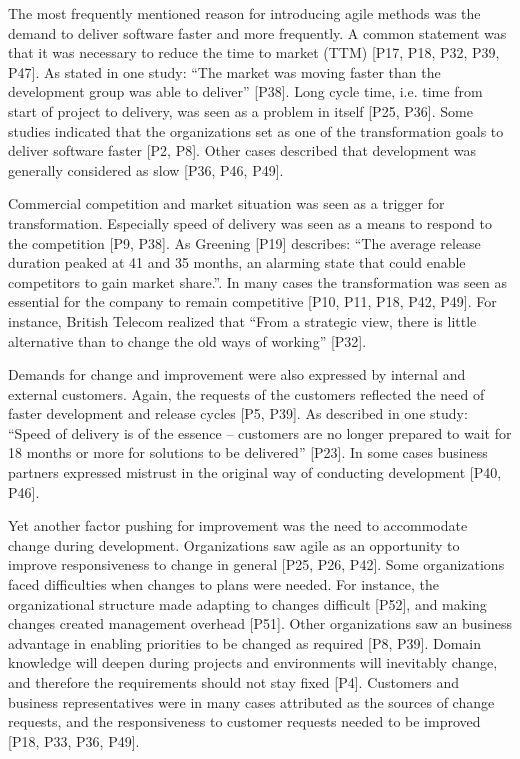 The most frequently mentioned reason for introducing agile methods was the demand to
deliver software faster and more frequently. A common statement was that it was
necessary to reduce the time to market (TTM) [P17, P18, P32, P39, P47]. As
stated in one study: ``The market was moving faster than the development group
was able to deliver'' [P38]. Long cycle time, i.e. time from start of project to
delivery, was seen as a problem in itself [P25, P36]. Some studies indicated
that the organizations set as one of the transformation goals to deliver
software faster [P2, P8]. Other cases described that development was generally
considered as slow [P36, P46, P49].

Commercial competition and market situation was seen as a trigger for
transformation. Especially speed of delivery was seen as a means to respond to
the competition [P9, P38]. As Greening [P19] describes: ``The average release
duration peaked at 41 and 35 months, an alarming state that could enable
competitors to gain market share.''. In many cases the transformation was seen
as essential for the company to remain competitive [P10, P11, P18, P42, P49].
For instance, British Telecom realized that ``From a strategic view, there is
little alternative than to change the old ways of working'' [P32].

Demands for change and improvement were also expressed by internal and external
customers. Again, the requests of the customers reflected the need of faster
development and release cycles [P5, P39]. As described in one study: ``Speed of
delivery is of the essence -- customers are no longer prepared to wait for 18
months or more for solutions to be delivered'' [P23]. In some cases business
partners expressed mistrust in the original way of conducting development [P40,
P46].

Yet another factor pushing for improvement was the need to accommodate change
during development. Organizations saw agile as an opportunity to improve
responsiveness to change in general [P25, P26, P42].
Some organizations faced difficulties when changes to plans were needed. For
instance, the organizational structure made adapting to changes difficult [P52],
and making changes created management overhead [P51]. Other organizations saw an
business advantage in enabling priorities to be changed as required [P8, P39].
Domain knowledge will deepen during projects and environments will inevitably
change, and therefore the requirements should not stay fixed [P4].
Customers and business representatives were in many cases attributed as the
sources of change requests, and the responsiveness to customer requests needed
to be improved [P18, P33, P36, P49].

